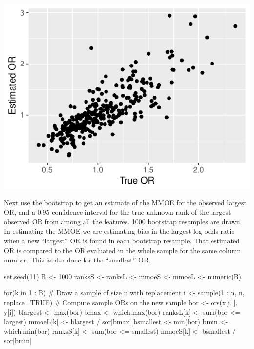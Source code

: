 \begin{Schunk}
\centerline{\includegraphics[width=\maxwidth]{hdata-simbd-1} }

\end{Schunk}

Next use the bootstrap to get an estimate of the MMOE for the observed
largest OR, and a 0.95 confidence 
interval for the true unknown rank of the largest observed OR from
among all the features.  1000 bootstrap resamples are drawn.  In
estimating the MMOE we are estimating bias in the largest log odds
ratio when a new ``largest'' OR is found in each bootstrap resample.
That estimated OR is compared to the OR evaluated in the whole sample
for the same column number.  This is also done for the ``smallest'' OR.

\begin{Schunk}
\begin{Sinput}
set.seed(11)
B <- 1000
ranksS <- ranksL <- mmoeS <- mmoeL <- numeric(B)

for(k in 1 : B) {
  # Draw a sample of size n with replacement
  i <- sample(1 : n, n, replace=TRUE)
  # Compute sample ORs on the new sample
  bor      <- ors(x[i, ], y[i])
  blargest <- max(bor)
  bmax     <- which.max(bor)
  ranksL[k] <- sum(bor <= largest)
  mmoeL[k]  <- blargest / sor[bmax]
  bsmallest <- min(bor)
  bmin      <- which.min(bor)
  ranksS[k] <- sum(bor <= smallest)
  mmoeS[k]  <- bsmallest / sor[bmin]
}
\end{Sinput}
\end{Schunk}

